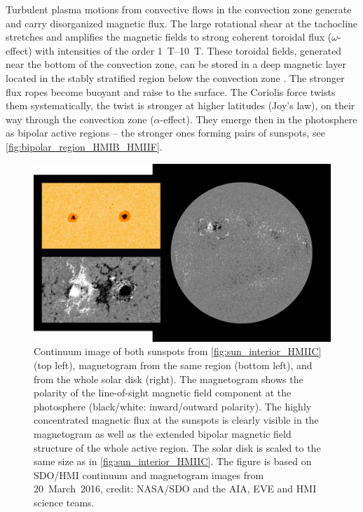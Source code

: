 
Turbulent plasma motions from convective flows in the convection zone generate and carry disorganized magnetic flux. The large rotational shear at the tachocline stretches and amplifies the magnetic fields to strong coherent toroidal flux ($\omega$-effect) with intensities of the order \SIrange{1}{10}{\tesla}. These toroidal fields, generated near the bottom of the convection zone, can be stored in a deep magnetic layer located in the stably stratified region below the convection zone \citep{Ossendrijver2003}. The stronger flux ropes become buoyant and raise to the surface. The Coriolis force twists them systematically, the twist is stronger at higher latitudes (Joy's law), on their way through the convection zone ($\alpha$-effect). They emerge then in the photosphere as bipolar active regions -- the stronger ones forming pairs of sunspots, see \autoref{fig:bipolar_region_HMIB_HMIIF}.
\begin{figure}[htb]
	\centering
	\includegraphics[width=\textwidth]{figures_of_mine/schemata/bipolar_region_HMIB_HMIIF.png}
	\caption{Continuum image of both sunspots from \autoref{fig:sun_interior_HMIIC} (top left), magnetogram from the same region (bottom left), and from the whole solar disk (right). The magnetogram shows the polarity of the line-of-sight magnetic field component at the photosphere (black/white: inward/outward polarity). The highly concentrated magnetic flux at the sunspots is clearly visible in the magnetogram as well as the extended bipolar magnetic field structure of the whole active region. The solar disk is scaled to the same size as in \autoref{fig:sun_interior_HMIIC}. The figure is based on SDO/HMI continuum and magnetogram images from 20~March~2016, credit: NASA/SDO and the AIA, EVE and HMI science teams.}
	\label{fig:bipolar_region_HMIB_HMIIF}
\end{figure}
